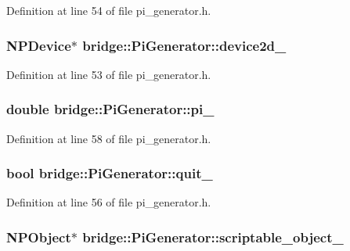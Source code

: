 Definition at line 54 of file pi\_\-generator.h.

\hypertarget{classbridge_1_1_pi_generator_a931cd35dcd337f8c8d31e401e714b67b}{
\subsubsection[{device2d\_\-}]{\setlength{\rightskip}{0pt plus 5cm}NPDevice$\ast$ {\bf bridge::PiGenerator::device2d\_\-}}}
\label{classbridge_1_1_pi_generator_a931cd35dcd337f8c8d31e401e714b67b}


Definition at line 53 of file pi\_\-generator.h.

\hypertarget{classbridge_1_1_pi_generator_a3d35a8b7e364db2572a1e3e983ff5053}{
\subsubsection[{pi\_\-}]{\setlength{\rightskip}{0pt plus 5cm}double {\bf bridge::PiGenerator::pi\_\-}}}
\label{classbridge_1_1_pi_generator_a3d35a8b7e364db2572a1e3e983ff5053}


Definition at line 58 of file pi\_\-generator.h.

\hypertarget{classbridge_1_1_pi_generator_a682f8e27a788cb81f1b862b02e6ab127}{
\subsubsection[{quit\_\-}]{\setlength{\rightskip}{0pt plus 5cm}bool {\bf bridge::PiGenerator::quit\_\-}}}
\label{classbridge_1_1_pi_generator_a682f8e27a788cb81f1b862b02e6ab127}


Definition at line 56 of file pi\_\-generator.h.

\hypertarget{classbridge_1_1_pi_generator_ae14b036a67c19bcd76c7974e3c0314e2}{
\subsubsection[{scriptable\_\-object\_\-}]{\setlength{\rightskip}{0pt plus 5cm}NPObject$\ast$ {\bf bridge::PiGenerator::scriptable\_\-object\_\-}}}
\label{classbridge_1_1_pi_generator_ae14b036a67c19bcd76c7974e3c0314e2}


